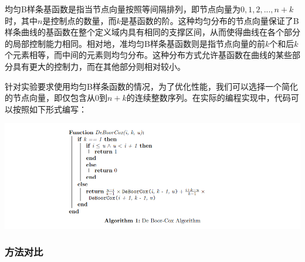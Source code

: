 \documentclass[a4paper,UTF8]{article}
\theoremstyle{definition}
\begin{document}
均匀B样条基函数是指当节点向量按照等间隔排列，即节点向量为$0,1,2,...,n+k$时，其中$n$是控制点的数量，而$k$是基函数的阶。这种均匀分布的节点向量保证了B样条曲线的基函数在整个定义域内具有相同的支撑区间，从而使得曲线在各个部分的局部控制能力相同。相对地，准均匀B样条基函数则是指节点向量的前$k$个和后$k$个元素相等，而中间的元素则均匀分布。这种分布方式允许基函数在曲线的某些部分具有更大的控制力，而在其他部分则相对较小。

针对实验要求使用均匀B样条函数的情况，为了优化性能，我们可以选择一个简化的节点向量，即仅包含从$0$到$n+k$的连续整数序列。在实际的编程实现中，代码可以按照如下形式编写：

\begin{center}
	\includegraphics[width=6in]{报告/algorithm1.png}
\end{center}

\subsubsection{方法对比}
\end{document}
